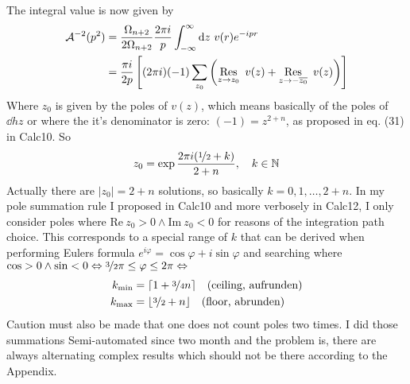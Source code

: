 \documentclass[10pt,a4paper, fleqn]{article}
\DeclarePairedDelimiter\ceil{\lceil}{\rceil}
\DeclarePairedDelimiter\floor{\lfloor}{\rfloor}
\begin{document}
The integral value is now given by
\begin{subequations}
\begin{align}
{\cal A}^{-2}(p^2) &= \frac{\Omega_{n+2}}{2 \Omega_{n+2}}
\frac{2\pi i}p \int_{-\infty}^{\infty} \mathrm{d} z ~v(r) e^{-ipr}
\\
&= \frac{\pi i}{2p} \left[
(2\pi i)(-1) \sum_{z_0} \left( \operatorname*{Res}_{z\to z_0}~v(z) +  \operatorname*{Res}_{z\to -\overline{z_0}} ~v(z) \right) \right]
\end{align}
\end{subequations}
Where $z_0$ is given by the poles of $v(z)$, which means basically of the poles of $\dd hz$ or where the it's denominator is zero: $(-1) = z^{2+n}$, as proposed in eq. (31) in Calc10. So
\begin{equation}
z_0 = \exp{\frac{ 2\pi i (\nicefrac 12 + k) }{ 2+n }},\quad k \in \mathbb{N}
\end{equation}
Actually there are $|{z_0}|=2+n$ solutions, so basically $k=0,1,\dots,2+n$. In my pole summation rule I proposed in Calc10 and more verbosely in Calc12, I only consider poles where $\text{Re}~z_0 >0 \wedge \text{Im}~z_0 <0$ for reasons of the integration path choice. This corresponds to a special range of $k$ that can be derived when performing Eulers formula $e^{i\varphi} = \cos \varphi + i \sin \varphi$ and searching where $\cos > 0 \wedge \sin <0 \Leftrightarrow \nicefrac  32 \pi \leq \varphi \leq 2\pi \Leftrightarrow$
\begin{subequations}
\begin{align}
k_{\text{min}} & = \ceil{1 + \nicefrac 34 n} \quad \text{(ceiling, aufrunden)}
\\
k_{\text{max}} &=  \floor{\nicefrac 32 + n} \quad \text{(floor, abrunden)}
\end{align}
\end{subequations}
Caution must also be made that one does not count poles two times. I did those summations Semi-automated since two month and the problem is, there are always alternating complex results which should not be there according to the Appendix.

\end{document}
